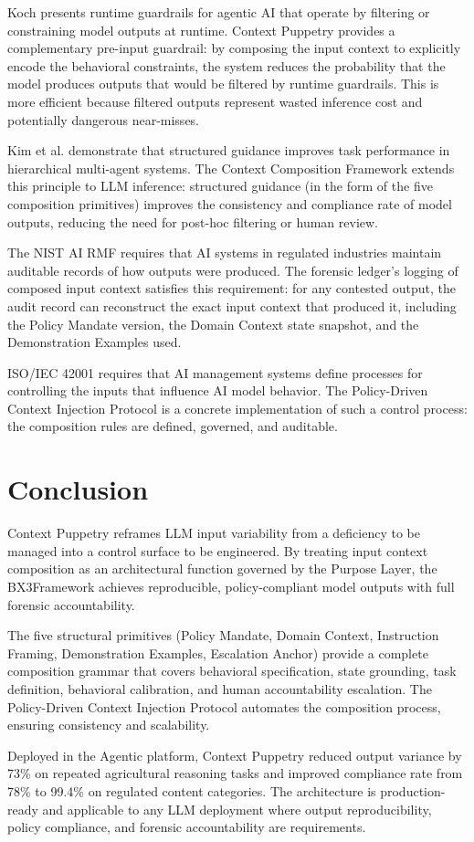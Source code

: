 \documentclass[12pt]{article}
\def\bxthree{BX3}
\begin{document}
Koch \cite{koch2026} presents runtime guardrails for agentic AI that operate by filtering or constraining model outputs at runtime. Context Puppetry provides a complementary pre-input guardrail: by composing the input context to explicitly encode the behavioral constraints, the system reduces the probability that the model produces outputs that would be filtered by runtime guardrails. This is more efficient because filtered outputs represent wasted inference cost and potentially dangerous near-misses.

Kim et al. \cite{kim2025tao} demonstrate that structured guidance improves task performance in hierarchical multi-agent systems. The Context Composition Framework extends this principle to LLM inference: structured guidance (in the form of the five composition primitives) improves the consistency and compliance rate of model outputs, reducing the need for post-hoc filtering or human review.

The NIST AI RMF \cite{nist2023} requires that AI systems in regulated industries maintain auditable records of how outputs were produced. The forensic ledger's logging of composed input context satisfies this requirement: for any contested output, the audit record can reconstruct the exact input context that produced it, including the Policy Mandate version, the Domain Context state snapshot, and the Demonstration Examples used.

ISO/IEC 42001 \cite{iso2023} requires that AI management systems define processes for controlling the inputs that influence AI model behavior. The Policy-Driven Context Injection Protocol is a concrete implementation of such a control process: the composition rules are defined, governed, and auditable.

\section{Conclusion}
Context Puppetry reframes LLM input variability from a deficiency to be managed into a control surface to be engineered. By treating input context composition as an architectural function governed by the Purpose Layer, the \bxthree Framework achieves reproducible, policy-compliant model outputs with full forensic accountability.

The five structural primitives (Policy Mandate, Domain Context, Instruction Framing, Demonstration Examples, Escalation Anchor) provide a complete composition grammar that covers behavioral specification, state grounding, task definition, behavioral calibration, and human accountability escalation. The Policy-Driven Context Injection Protocol automates the composition process, ensuring consistency and scalability.

Deployed in the Agentic platform, Context Puppetry reduced output variance by 73\% on repeated agricultural reasoning tasks and improved compliance rate from 78\% to 99.4\% on regulated content categories. The architecture is production-ready and applicable to any LLM deployment where output reproducibility, policy compliance, and forensic accountability are requirements.



\end{document}
